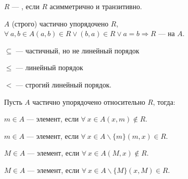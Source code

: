 \begin{definition}
    $R$ --- , если $R$ асимметрично и транзитивно.
\end{definition}

\begin{definition}
    $A$ (строго) частично упорядочено $R$, $\forall ~a, b \in A (a, b) \in R \vee (b, a) \in R \vee a = b \Rightarrow R$ ---  на $A$.
\end{definition}

\begin{examples}
    \begin{compactenum}
        \item $\subseteq$ --- частичный, но не линейный порядок
        \item $\leq$ --- линейный порядок
        \item $<$ --- строгий линейный порядок.
    \end{compactenum}
\end{examples}

\begin{definition}
    Пусть $A$ частично упорядочено относительно $R$, тогда:

    \begin{compactitem}
        \item $m \in A$ ---  элемент, если $\forall ~x \in A (x, m) \notin R$.
        \item $m \in A$ ---  элемент, если $\forall ~x \in A\backslash\{m\} (m, x) \in R$.
        \item $M \in A$ ---  элемент, если $\forall ~x \in A (M, x) \notin R$.
        \item $M \in A$ ---  элемент, если $\forall ~x \in A\backslash\{M\} (x, M) \in R$.
    \end{compactitem}
\end{definition}